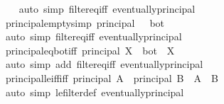 \begin{isabellebody}
%
\isadelimproof
\ \ %
\endisadelimproof
%
\isatagproof
{}\isamarkupfalse%
\ {\isacharparenleft}{\kern0pt}auto\ simp{\isacharcolon}{\kern0pt}\ filter{\isacharunderscore}{\kern0pt}eq{\isacharunderscore}{\kern0pt}iff\ eventually{\isacharunderscore}{\kern0pt}principal{\isacharparenright}{\kern0pt}%
\endisatagproof
{\isafoldproof}%
%
\isadelimproof
\isanewline
%
\endisadelimproof
\isanewline
{}\isamarkupfalse%
\ principal{\isacharunderscore}{\kern0pt}empty{\isacharbrackleft}{\kern0pt}simp{\isacharbrackright}{\kern0pt}{\isacharcolon}{\kern0pt}\ {\isachardoublequoteopen}principal\ {\isacharbraceleft}{\kern0pt}{\isacharbraceright}{\kern0pt}\ {\isacharequal}{\kern0pt}\ bot{\isachardoublequoteclose}\isanewline
%
\isadelimproof
\ \ %
\endisadelimproof
%
\isatagproof
{}\isamarkupfalse%
\ {\isacharparenleft}{\kern0pt}auto\ simp{\isacharcolon}{\kern0pt}\ filter{\isacharunderscore}{\kern0pt}eq{\isacharunderscore}{\kern0pt}iff\ eventually{\isacharunderscore}{\kern0pt}principal{\isacharparenright}{\kern0pt}%
\endisatagproof
{\isafoldproof}%
%
\isadelimproof
\isanewline
%
\endisadelimproof
\isanewline
{}\isamarkupfalse%
\ principal{\isacharunderscore}{\kern0pt}eq{\isacharunderscore}{\kern0pt}bot{\isacharunderscore}{\kern0pt}iff{\isacharcolon}{\kern0pt}\ {\isachardoublequoteopen}principal\ X\ {\isacharequal}{\kern0pt}\ bot\ {\isasymlongleftrightarrow}\ X\ {\isacharequal}{\kern0pt}\ {\isacharbraceleft}{\kern0pt}{\isacharbraceright}{\kern0pt}{\isachardoublequoteclose}\isanewline
%
\isadelimproof
\ \ %
\endisadelimproof
%
\isatagproof
{}\isamarkupfalse%
\ {\isacharparenleft}{\kern0pt}auto\ simp\ add{\isacharcolon}{\kern0pt}\ filter{\isacharunderscore}{\kern0pt}eq{\isacharunderscore}{\kern0pt}iff\ eventually{\isacharunderscore}{\kern0pt}principal{\isacharparenright}{\kern0pt}%
\endisatagproof
{\isafoldproof}%
%
\isadelimproof
\isanewline
%
\endisadelimproof
\isanewline
{}\isamarkupfalse%
\ principal{\isacharunderscore}{\kern0pt}le{\isacharunderscore}{\kern0pt}iff{\isacharbrackleft}{\kern0pt}iff{\isacharbrackright}{\kern0pt}{\isacharcolon}{\kern0pt}\ {\isachardoublequoteopen}principal\ A\ {\isasymle}\ principal\ B\ {\isasymlongleftrightarrow}\ A\ {\isasymsubseteq}\ B{\isachardoublequoteclose}\isanewline
%
\isadelimproof
\ \ %
\endisadelimproof
%
\isatagproof
{}\isamarkupfalse%
\ {\isacharparenleft}{\kern0pt}auto\ simp{\isacharcolon}{\kern0pt}\ le{\isacharunderscore}{\kern0pt}filter{\isacharunderscore}{\kern0pt}def\ eventually{\isacharunderscore}{\kern0pt}principal{\isacharparenright}{\kern0pt}%

\end{isabellebody}
